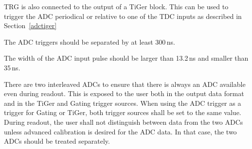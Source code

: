 {    TRG is also connected to the output of a TiGer block.  This
    can be used  to trigger the ADC periodical or relative to one of the TDC
    inputs as described in Section~\ref{adctiger}

    The ADC triggers should be separated by at least 300\,ns.

    The width of the ADC input pulse should be larger than 13.2\,ns and
    smaller than 35\,ns.

    There are two interleaved ADCs to ensure that there is always an ADC
    available even during readout. This is exposed to the user both in the
    output data format and in the TiGer and Gating trigger sources.  When
    using the ADC trigger as a trigger for Gating or TiGer, both trigger
    sources shall be set to the same value.  During readout, the user shall
    not distinguish between data from the two ADCs unless advanced calibration
    is desired for the ADC data. In that case, the two ADCs should be treated
    separately.   
}{}
